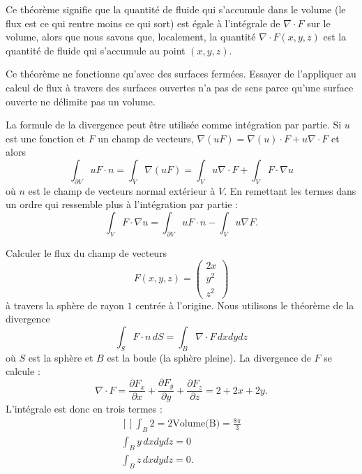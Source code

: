 Ce théorème signifie que la quantité de fluide qui s'accumule dans le volume (le flux est ce qui rentre moins ce qui sort) est égale à l'intégrale de \( \nabla\cdot F\) sur le volume, alors que nous savons que, localement, la quantité \( \nabla\cdot F(x,y,z)\) est la quantité de fluide qui s'accumule au point \( (x,y,z)\).

\begin{remark}
	Ce théorème ne fonctionne qu'avec des surfaces fermées. Essayer de l'appliquer au calcul de flux à travers des surfaces ouvertes n'a pas de sens parce qu'une surface ouverte ne délimite pas un volume.
\end{remark}

\begin{normaltext}
	La formule de la divergence peut être utilisée comme intégration par partie. Si \( u\) est une fonction et \( F\) un champ de vecteurs, \( \nabla(uF)=\nabla(u)\cdot F+u\nabla\cdot F\) et alors
	\begin{equation}
		\int_{\partial V}uF\cdot n=\int_V\nabla(uF)=\int_Vu\nabla\cdot F+\int_VF\cdot \nabla u
	\end{equation}
	où \( n\) est le champ de vecteurs normal extérieur à \( V\). En remettant les termes dans un ordre qui ressemble plus à l'intégration par partie :
	\begin{equation}        \label{EQooRUCKooUUrgxI}
		\int_{V}F\cdot \nabla u=\int_{\partial V}uF\cdot n-\int_Vu\nabla F.
	\end{equation}
\end{normaltext}

\begin{example}
	Calculer le flux du champ de vecteurs
	\begin{equation}
		F(x,y,z)=\begin{pmatrix}
			2x  \\
			y^2 \\
			z^2
		\end{pmatrix}
	\end{equation}
	à travers la sphère de rayon \( 1\) centrée à l'origine. Nous utilisons le théorème de la divergence
	\begin{equation}
		\int_S F\cdot n\,dS=\int_B\nabla \cdot F\,dxdydz
	\end{equation}
	où \( S\) est la sphère et \( B\) est la boule (la sphère pleine). La divergence de \( F\) se calcule :
	\begin{equation}
		\nabla\cdot F=\frac{ \partial F_x }{ \partial x }+\frac{ \partial F_y }{ \partial y }+\frac{ \partial F_z }{ \partial z }=2+2x+2y.
	\end{equation}
	L'intégrale est donc en trois termes :
	\begin{equation}
		\begin{aligned}[]
			\int_B2=2\text{Volume(B)}=\frac{ 8\pi }{ 3 } \\
			\int_By\,dxdydz=0                            \\
			\int_Bz\,dxdydz=0.
		\end{aligned}
	\end{equation}
\end{example}

